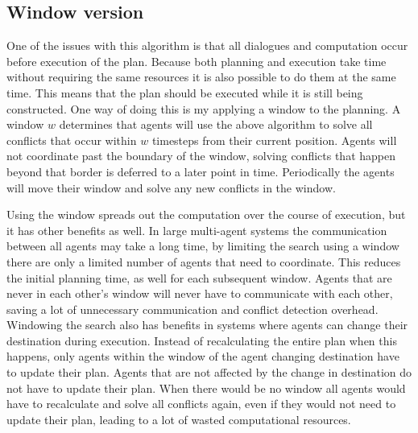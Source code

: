 \subsection{Window version}
One of the issues with this algorithm is that all dialogues and computation
occur before execution of the plan. Because both planning and execution take
time without requiring the same resources it is also possible to do them at the
same time. This means that the plan should be executed while it is still being
constructed. One way of doing this is my applying a window to the planning. A
window $w$ determines that agents will use the above algorithm to solve all
conflicts that occur within $w$ timesteps from their current position. Agents
will not coordinate past the boundary of the window, solving conflicts that
happen beyond that border is deferred to a later point in time. Periodically
the agents will move their window and solve any new conflicts in the window.

Using the window spreads out the computation over the course of execution, but
it has other benefits as well. In large multi-agent systems the communication
between all agents may take a long time, by limiting the search using a window
there are only a limited number of agents that need to coordinate. This reduces
the initial planning time, as well for each subsequent window. Agents that are
never in each other's window will never have to communicate with each other,
saving a lot of unnecessary communication and conflict detection overhead.
Windowing the search also has benefits in systems where agents can change their
destination during execution. Instead of recalculating the entire plan when
this happens, only agents within the window of the agent changing destination
have to update their plan. Agents that are not affected by the change in
destination do not have to update their plan. When there would be no window all
agents would have to recalculate and solve all conflicts again, even if they
would not need to update their plan, leading to a lot of wasted computational
resources.

